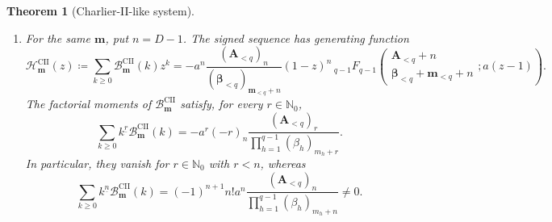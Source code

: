 \documentclass[10pt,a4paper]{amsart}
\newtheorem{theorem}{Theorem}
\newcommand{\A}{\boldsymbol A}
\newcommand{\Nzero}{\mathbb N_0}
\newcommand{\bbeta}{\boldsymbol\beta}
\newcommand{\fall}[2]{#1^{\underline{#2}}}
\newcommand{\mm}{\boldsymbol m}
\newcommand{\pFq}[5]{{}_{#1}F_{#2}\!\left(\begin{matrix}#3\\#4\end{matrix};#5\right)}
\begin{document}
\begin{theorem}[Charlier-II-like system]
\begin{enumerate}[label=\textnormal{(\roman*)}]
\item For the same \(\mm\), put \(n=D-1\). The signed sequence has
generating function
\begin{equation}
 \mathcal H_{\mm}^{\mathrm{CII}}(z)
 \coloneq\sum_{k\ge0}\mathcal B_{\mm}^{\mathrm{CII}}(k)z^k
 =-a^n\frac{(\A_{<q})_n}{(\bbeta_{<q})_{\mm_{<q}+n}}(1-z)^n
 \,\pFq{q-1}{q-1}
 {\A_{<q}+n}{\bbeta_{<q}+\mm_{<q}+n}{a(z-1)}.
 \label{eq:CII-B}
\end{equation}
The factorial moments of \(\mathcal B_{\mm}^{\mathrm{CII}}\) satisfy,
for every \(r\in\Nzero\),
\begin{equation}
 \sum_{k\ge0}\fall{k}{r}\mathcal B_{\mm}^{\mathrm{CII}}(k)
 =
 -a^r(-r)_n\frac{(\A_{<q})_r}
 {\prod_{h=1}^{q-1}(\beta_h)_{m_h+r}}.
 \label{eq:CII-B-moments}
\end{equation}
In particular, they vanish for \(r\in\Nzero\) with \(r<n\), whereas
\begin{equation}
 \sum_{k\ge0}\fall{k}{n}\mathcal B_{\mm}^{\mathrm{CII}}(k)
 =(-1)^{n+1}n!a^n
 \frac{(\A_{<q})_n}{\prod_{h=1}^{q-1}(\beta_h)_{m_h+n}}\ne0.
 \label{eq:CII-B-leading-moment}
\end{equation}
\end{enumerate}
\end{theorem}
\end{document}
